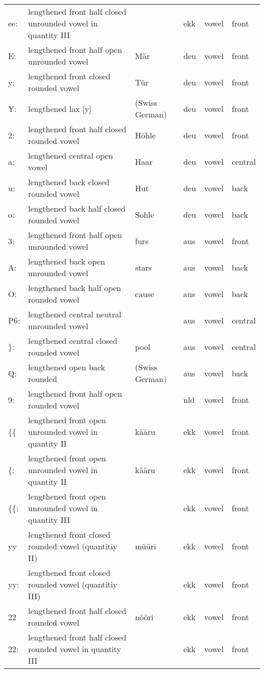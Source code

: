 {\begin{longtable}{l|p{.3\linewidth}|p{.15\linewidth}|l|p{.15\linewidth}|l}
	ee:	& lengthened front half closed unrounded vowel in quantity III	& 	& ekk	& vowel	& front	\\
	E:	& lengthened front half open unrounded vowel	& Mär	& deu	& vowel	& front	\\
	y:	& lengthened front closed rounded vowel	& Tür	& deu	& vowel	& front	\\
	Y:	& lengthened lax [y]	& (Swiss German)	& deu	& vowel	& front	\\
	2:	& lengthened front half closed rounded vowel	& Höhle	& deu	& vowel	& front	\\
	a:	& lengthened central open vowel	& Haar	& deu	& vowel	& central	\\
	u:	& lengthened back closed rounded vowel	& Hut	& deu	& vowel	& back	\\
	o:	& lengthened back half closed rounded vowel	& Sohle	& deu	& vowel	& back	\\
	3:	& lengthened front half open unrounded vowel	& furs	& aus	& vowel	& front	\\
	A:	& lengthened back open unrounded vowel	& stars	& aus	& vowel	& back	\\
	O:	& lengthened back half open rounded vowel	& cause	& aus	& vowel	& back	\\
	P6:	& lengthened central neutral unrounded vowel	& 	& aus	& vowel	& central	\\
	\}:	& lengthened central closed rounded vowel	& pool	& aus	& vowel	& central	\\
	Q:	& lengthened open back rounded	& (Swiss German)	& aus	& vowel	& back	\\
	9:	& lengthened front half open rounded vowel	& 	& nld	& vowel	& front	\\
	\{\{	& lengthened front open unrounded vowel in quantity II	& kääru	& ekk	& vowel	& front	\\
	\{:	& lengthened front open unrounded vowel in quantity II	& kääru	& ekk	& vowel	& front	\\
	\{\{:	& lengthened front open unrounded vowel in quantity III	& 	& ekk	& vowel	& front	\\
	yy	& lengthened front closed rounded vowel (quantitiy II)	& müüri	& ekk	& vowel	& front	\\
	yy:	& lengthened front closed rounded vowel (quantitiy III)	& 	& ekk	& vowel	& front	\\
	22	& lengthened front half closed rounded vowel	& nööri	& ekk	& vowel	& front	\\
	22:	& lengthened front half closed rounded vowel in quantity III	& 	& ekk	& vowel	& front	\\

\end{longtable}}
